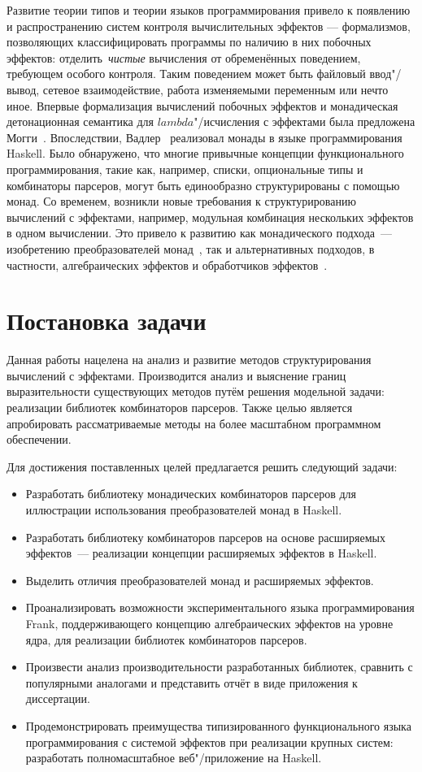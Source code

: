 \documentclass [fontsize=14pt, paper=a4, pagesize, DIV=calc]%
{article}
\begin{document}
Развитие теории типов и теории языков программирования привело к появлению и
распространению систем контроля вычислительных эффектов --- формализмов, позволяющих
классифицировать программы по наличию в них побочных эффектов: отделить~\emph{чистые}
вычисления от обременённых поведением, требующем особого контроля. Таким поведением
может быть файловый ввод"/вывод, сетевое взаимодействие, работа изменяемыми переменным
или нечто иное. Впервые формализация вычислений побочных эффектов и монадическая
детонационная семантика для $lambda$"/исчисления с эффектами была предложена
Могги~\cite{Moggi:1991:NCM:116981.116984}. Впоследствии,
Вадлер~\cite{Wadler:1992:EFP:143165.143169} реализовал монады в языке программирования
Haskell. Было обнаружено, что многие привычные концепции функционального программирования,
такие как, например, списки, опциональные типы и комбинаторы парсеров, могут быть
единообразно структурированы с помощью монад. Со временем, возникли новые требования
к структурированию вычислений с эффектами, например, модульная комбинация нескольких
эффектов в одном вычислении. Это привело к развитию как монадического подхода~---
изобретению преобразователей монад~\cite{Liang:1995:MTM:199448.199528}, так и
альтернативных подходов, в частности, алгебраических эффектов и обработчиков
эффектов~\cite{DBLP:journals/jlp/BauerP15}.

\section{Постановка задачи}

Данная работы нацелена на анализ и развитие методов структурирования вычислений
с эффектами. Производится анализ и выяснение границ выразительности существующих
методов путём решения модельной задачи: реализации библиотек комбинаторов парсеров.
Также целью является апробировать рассматриваемые методы на более масштабном программном обеспечении.

Для достижения поставленных целей предлагается решить следующий задачи:

\begin{itemize}
\item Разработать библиотеку монадических комбинаторов парсеров для
иллюстрации использования преобразователей монад в Haskell.
\item Разработать библиотеку комбинаторов парсеров на основе расширяемых эффектов~---
реализации концепции расширяемых эффектов в Haskell.
\item Выделить отличия преобразователей монад и расширяемых эффектов.
\item Проанализировать возможности экспериментального языка программирования Frank,
поддерживающего концепцию алгебраических эффектов на уровне ядра, для реализации
библиотек комбинаторов парсеров.
\item Произвести анализ производительности разработанных библиотек, сравнить с
популярными аналогами и представить отчёт в виде приложения к диссертации.
\item Продемонстрировать преимущества типизированного функционального языка программирования
с системой эффектов при реализации крупных систем: разработать полномасштабное
веб"/приложение на Haskell.
\end{itemize}
\end{document}
